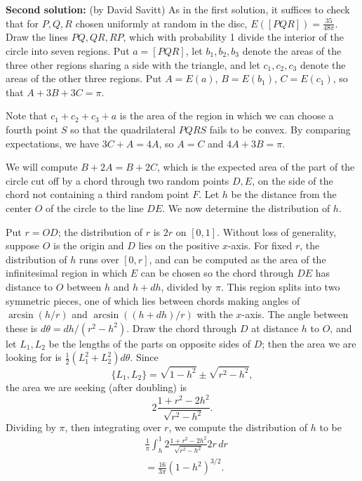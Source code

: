 \documentclass[amssymb,twocolumn,pra,10pt,aps]{revtex4-1}
\begin{document}
\begin{itemize}
\textbf{Second solution:}
(by David Savitt)
As in the first solution, it suffices to check that for
$P,Q,R$ chosen uniformly at random in the disc, $E([PQR]) = \frac{35}{48 \pi}$.
Draw the lines $PQ, QR, RP$, which with probability 1 divide the interior
of the circle into seven regions. Put $a = [PQR]$, let $b_1,b_2,b_3$
denote the areas of the
three other regions sharing a side with the triangle, and let
$c_1,c_2,c_3$ denote the areas of the other three regions.
Put $A = E(a)$, $B = E(b_1)$, $C = E(c_1)$, so that
$A + 3B + 3C = \pi$.

Note that $c_1 + c_2 + c_3 + a$ is the area of the region in which we can
choose a fourth point $S$ so that the quadrilateral $PQRS$ fails to be
convex. By comparing expectations, we have $3C + A = 4A$,
so $A = C$ and $4A + 3B = \pi$.

We will compute $B + 2A = B + 2C$, which is the expected area of the part
of the circle cut off by a chord through two random points $D,E$, on the
side of the chord not containing a third random point $F$.
Let $h$ be the distance from the center $O$ of the circle to the line $DE$.
We now determine the distribution of $h$.

Put $r = OD$; the distribution of $r$ is $2r$ on $[0,1]$.
Without loss of generality, suppose $O$ is the origin and
$D$ lies on the positive $x$-axis.
For fixed $r$, the distribution of $h$ runs over $[0,r]$,
and can be computed as the area of the infinitesimal region in which
$E$ can be chosen so the chord through $DE$ has distance to $O$
between $h$ and $h+dh$, divided by $\pi$.
This region splits into two symmetric pieces, one of which lies
between chords making angles of $\arcsin(h/r)$ and
$\arcsin((h + dh)/r)$ with the $x$-axis.
The angle between these is $d\theta = dh/(r^2 - h^2)$.
Draw the chord through $D$ at distance $h$ to $O$, and let $L_1,L_2$ be the
lengths of the parts on opposite sides of $D$; then
the area we are looking for is $\frac{1}{2}(L_1^2 + L_2^2) d\theta$.
Since
\[
\{L_1, L_2 \} = \sqrt{1-h^2} \pm \sqrt{r^2 - h^2},
\]
the area we are seeking (after doubling) is
\[
2\frac{1 + r^2 - 2h^2}{\sqrt{r^2 - h^2}}.
\]
Dividing by $\pi$, then integrating over $r$, we compute the distribution
of $h$ to be
\begin{align*}
&\frac{1}{\pi} \int_h^1 2 \frac{1 + r^2 - 2h^2}{\sqrt{r^2 - h^2}} 2r\,dr \\
&= \frac{16}{3\pi} (1-h^2)^{3/2}.
\end{align*}


\end{itemize}
\end{document}

